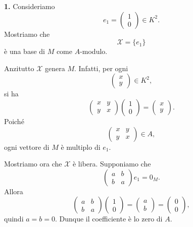 \documentclass[a4paper]{article}
\begin{document}
\begin{radioactive}
\begin{snippetsolution}{}
    \textbf{1.} Consideriamo
    \[
        e_1=
        \begin{pmatrix}
            1\\
            0
        \end{pmatrix}
        \in K^2.
    \]
    Mostriamo che
    \[
        \mathcal{X}=\{e_1\}
    \]
    è una base di \(M\) come \(A\)-modulo.

    Anzitutto \(\mathcal{X}\) genera \(M\). Infatti, per ogni
    \[
        \begin{pmatrix}
            x\\
            y
        \end{pmatrix}
        \in K^2,
    \]
    si ha
    \[
        \begin{pmatrix}
            x & y\\
            y & x
        \end{pmatrix}
        \begin{pmatrix}
            1\\
            0
        \end{pmatrix}
        =
        \begin{pmatrix}
            x\\
            y
        \end{pmatrix}.
    \]
    Poiché
    \[
        \begin{pmatrix}
            x & y\\
            y & x
        \end{pmatrix}
        \in A,
    \]
    ogni vettore di \(M\) è multiplo di \(e_1\).

    Mostriamo ora che \(\mathcal{X}\) è libera. Supponiamo che
    \[
        \begin{pmatrix}
            a & b\\
            b & a
        \end{pmatrix}
        e_1
        =
        0_M.
    \]
    Allora
    \[
        \begin{pmatrix}
            a & b\\
            b & a
        \end{pmatrix}
        \begin{pmatrix}
            1\\
            0
        \end{pmatrix}
        =
        \begin{pmatrix}
            a\\
            b
        \end{pmatrix}
        =
        \begin{pmatrix}
            0\\
            0
        \end{pmatrix},
    \]
    quindi \(a=b=0\). Dunque il coefficiente è lo zero di \(A\).


\end{snippetsolution}
\end{radioactive}
\end{document}
